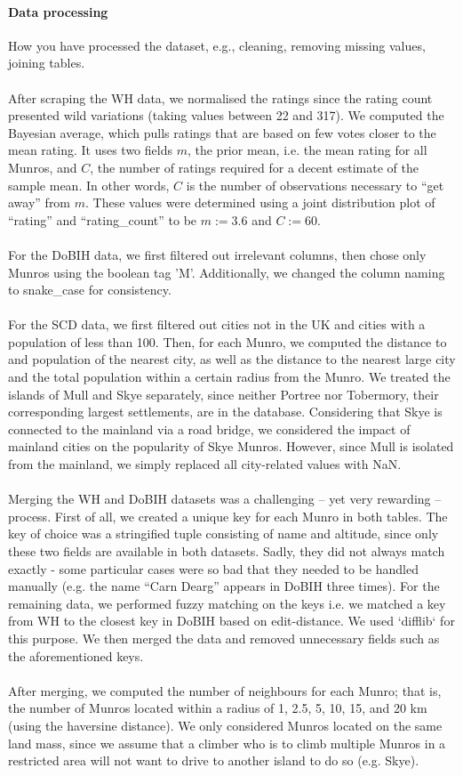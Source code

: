 \documentclass[11pt,a4paper]{article}
\begin{document}
\paragraph{Data processing} How you have processed the dataset, e.g.,
cleaning, removing missing values, joining tables.\\ \\
After scraping the WH data, we normalised the ratings since the rating count presented wild variations (taking values between 22 and 317). We computed the Bayesian average, which pulls ratings that are based on few votes closer to the mean rating. It uses two fields $m$, the prior mean, i.e. the mean rating for all Munros, and $C$, the number of ratings required for a decent estimate of the sample mean. In other words, $C$ is the number of observations necessary to “get away” from $m$. These values were determined using a joint distribution plot of “rating” and “rating\_count” to be $m := 3.6$ and $C := 60$. \\ \\
For the DoBIH data, we first filtered out irrelevant columns, then chose only Munros using the boolean tag 'M'. Additionally, we changed the column naming to snake\_case for consistency. \\ \\
For the SCD data, we first filtered out cities not in the UK and cities with a population of less than 100. Then, for each Munro, we computed the distance to and population of the nearest city, as well as the distance to the nearest large city and the total population within a certain radius from the Munro. We treated the islands of Mull and Skye separately, since neither Portree nor Tobermory, their corresponding largest settlements, are in the database. Considering that Skye is connected to the mainland via a road bridge, we considered the impact of mainland cities on the popularity of Skye Munros. However, since Mull is isolated from the mainland, we simply replaced all city-related values with NaN. \\ \\
Merging the WH and DoBIH datasets was a challenging – yet very rewarding – process. First of all, we created a unique key for each Munro in both tables. The key of choice was a stringified tuple consisting of name and altitude, since only these two fields are available in both datasets. Sadly, they did not always match exactly - some particular cases were so bad that they needed to be handled manually (e.g. the name “Carn Dearg” appears in DoBIH three times). For the remaining data, we performed fuzzy matching on the keys i.e. we matched a key from WH to the closest key in DoBIH based on edit-distance.  We used `difflib` for this purpose. We then merged the data and removed unnecessary fields such as the aforementioned keys. \\ \\
After merging, we computed the number of neighbours for each Munro; that is, the number of Munros located within a radius of 1, 2.5, 5, 10, 15, and 20 km (using the haversine distance). We only considered Munros located on the same land mass, since we assume that a climber who is to climb multiple Munros in a restricted area will not want to drive to another island to do so (e.g. Skye).
\end{document}

